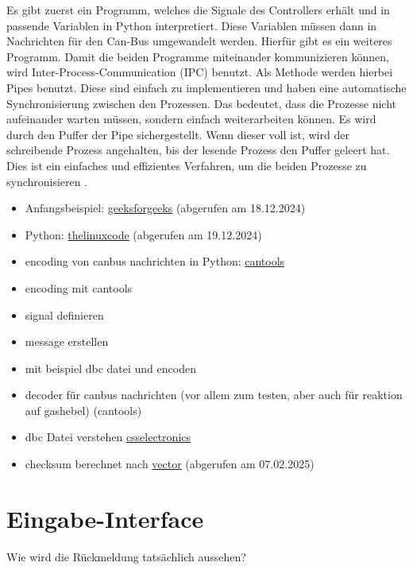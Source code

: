 Es gibt zuerst ein Programm, welches die Signale des Controllers erhält und in passende Variablen in Python interpretiert. Diese Variablen müssen
dann in Nachrichten für den Can-Bus umgewandelt werden. Hierfür gibt es ein weiteres Programm. Damit die beiden Programme miteinander kommunizieren
können, wird Inter-Process-Communication (IPC) benutzt. Als Methode werden hierbei Pipes benutzt. Diese sind einfach zu implementieren und haben
eine automatische Synchronisierung zwischen den Prozessen. Das bedeutet, dass die Prozesse nicht aufeinander warten müssen, sondern einfach
weiterarbeiten können. Es wird durch den Puffer der Pipe sichergestellt. Wenn dieser voll ist, wird der schreibende Prozess angehalten, bis der
lesende Prozess den Puffer geleert hat. Dies ist ein einfaches und effizientes Verfahren, 
um die beiden Prozesse zu synchronisieren \cite{Venkataraman2015}. 

\begin{itemize}
    \item Anfangsbeispiel: \href{https://www.geeksforgeeks.org/inter-process-communication-ipc/}{geeksforgeeks} (abgerufen am 18.12.2024)
    \item Python: \href{https://thelinuxcode.com/python-pipe-example/}{thelinuxcode} (abgerufen am 19.12.2024)
    \item encoding von canbus nachrichten in Python: \href{https://cantools.readthedocs.io/en/latest/}{cantools}
\end{itemize}

\begin{itemize}
    \item encoding mit cantools
    \item signal definieren
    \item message erstellen
    \item mit beispiel dbc datei und encoden
    \item decoder für canbus nachrichten (vor allem zum testen, aber auch für reaktion auf gashebel) (cantools)
    \item dbc Datei verstehen \href{https://www.csselectronics.com/pages/can-dbc-file-database-intro}{csselectronics}
    \item checksum berechnet nach \href{https://www.vector.com/de/de/know-how/protokolle/sae-j1939/#c103447}{vector} (abgerufen am 07.02.2025)
\end{itemize}

\section{Eingabe-Interface}
Wie wird die Rückmeldung tatsächlich aussehen?